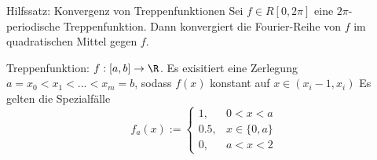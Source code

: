 \begin{satz}{Hilfssatz: Konvergenz von Treppenfunktionen}
    Sei $f \in R[0,2\pi]$ eine $2\pi$-periodische Treppenfunktion. Dann konvergiert
    die Fourier-Reihe von $f$ im quadratischen Mittel gegen $f$.
\end{satz}
Treppenfunktion: $f: [a,b] \to \R$.
Es exisitiert eine Zerlegung $a = x_0 < x_1 < ... < x_m = b$, sodass $f(x)$ konstant auf $x \in (x_i-1, x_i)$
Es gelten die Spezialfälle
$$
f_a(x) := 
    \begin{cases}
         1, & 0 < x < a \\ 
         0.5, & x \in \{0, a\} \\ 
         0, & a < x < 2
    \end{cases}
$$


